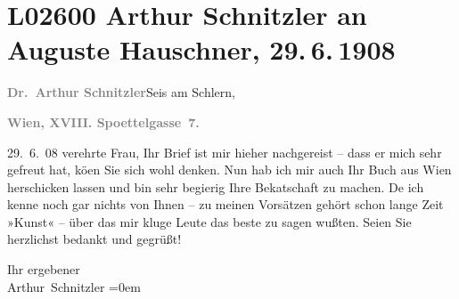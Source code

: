 

\section[Arthur Schnitzler an Auguste Hauschner, 29. 6. 1908]{L02600 Arthur Schnitzler an Auguste Hauschner, 29. 6. 1908}
\nopagebreak{}
\rehead{ }\normalsize\beginnumbering{}
\toendnotes[C]{\smallbreak\pagebreak[2]}
\toendnotes[C]{\smallbreak}
\pstart
           {\pb}\textcolor{gray}{\textbf{Dr. Arthur Schnitzler}}\hfill Seis am Schlern,\pend
           
\pstart
           
\pstart
           \textcolor{gray}{\textbf{Wien, XVIII. Spoettelgasse 7.}}\pend
           
\pstart
           \raggedleft{}29. 6. 08\pend
           \pend
           \vspace{0.5em}
\pstart
           verehrte Frau, Ihr Brief ist mir hieher nachgereist – dass er mich
               sehr gefreut hat, kö{\geminationn}en Sie sich wohl denken. Nun hab
               ich mir auch Ihr Buch aus Wien herschicken lassen und bin sehr begierig Ihre
                  Beka{\geminationn}tschaft zu machen. De{\geminationn} ich kenne noch gar nichts von Ihnen – zu meinen
               Vorsätzen {\pb}gehört schon lange Zeit
                  »Kunst« – über das mir kluge Leute das beste
               zu sagen wußten. Seien Sie herzlichst bedankt und gegrüßt!\pend
           
\pstart
           Ihr ergebener{\\[\baselineskip]}\spacefill\mbox{Arthur Schnitzler}\pend
           \leftskip=0em{}\endnumbering{}  
      